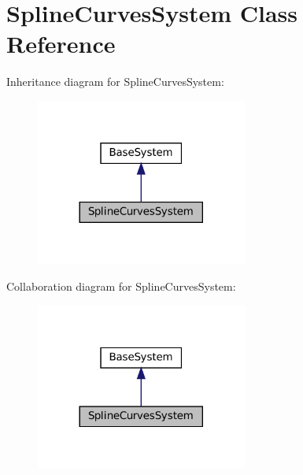 \hypertarget{classSplineCurvesSystem}{}\section{Spline\+Curves\+System Class Reference}
\label{classSplineCurvesSystem}


Inheritance diagram for Spline\+Curves\+System\+:
\nopagebreak
\begin{figure}[H]
\begin{center}
\leavevmode
\includegraphics[width=197pt]{classSplineCurvesSystem__inherit__graph}
\end{center}
\end{figure}


Collaboration diagram for Spline\+Curves\+System\+:
\nopagebreak
\begin{figure}[H]
\begin{center}
\leavevmode
\includegraphics[width=197pt]{classSplineCurvesSystem__coll__graph}
\end{center}
\end{figure}
